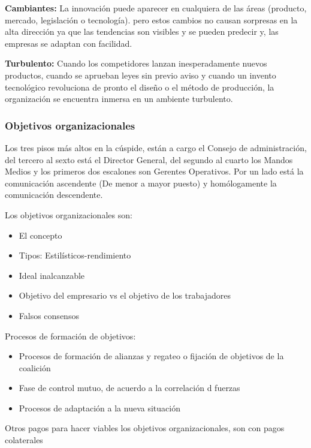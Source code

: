 \textbf{Cambiantes:} La innovación puede aparecer en cualquiera de las áreas (producto, mercado, legislación o tecnología). pero estos cambios no causan sorpresas en la alta dirección ya que las tendencias son visibles y se pueden predecir y, las empresas se adaptan con facilidad.

\textbf{Turbulento:} Cuando los competidores lanzan inesperadamente nuevos productos, cuando se aprueban leyes sin previo aviso y cuando un invento tecnológico revoluciona de pronto el diseño o el método de producción, la organización se encuentra inmersa en un ambiente turbulento.

\subsubsection{Objetivos organizacionales}
\begin{center}
\end{center}
Los tres pisos más altos en la cúspide, están a cargo el Consejo de administración, del tercero al sexto está el Director General, del segundo al cuarto los Mandos Medios y los primeros dos escalones son Gerentes Operativos. Por un lado está la comunicación ascendente (De menor a mayor puesto) y homólogamente la comunicación descendente.

Los objetivos organizacionales son:
\begin{itemize}
    \item El concepto
    \item Tipos: Estilísticos-rendimiento
    \item Ideal inalcanzable
    \item Objetivo del empresario vs el objetivo de los trabajadores
    \item Falsos consensos
\end{itemize}
Procesos de formación de objetivos:
\begin{itemize}
    \item Procesos de formación de alianzas y regateo o fijación de objetivos de la coalición
    \item Fase de control mutuo, de acuerdo a la correlación d fuerzas
    \item Procesos de adaptación a la nueva situación
\end{itemize}
Otros pagos para hacer viables los objetivos organizacionales, son con pagos colaterales

